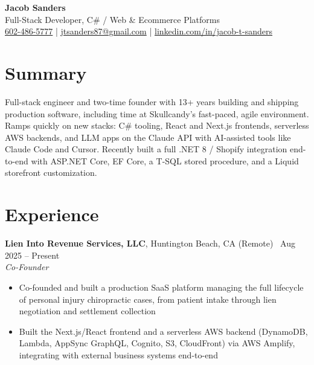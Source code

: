 \documentclass[10.5pt, letterpaper]{article}
\newcommand{\jobentry}[4]{%
  \noindent
  \textbf{\color{accent}#1}\textcolor{muted}{, #2 \textbullet\ #4}\\
  \textit{#3}%
}
\begin{document}
\begin{center}
  {\fontsize{28}{32}\selectfont\bfseries\color{accent} Jacob Sanders}\\[5pt]
  {\large\color{muted} Full-Stack Developer, C\# / Web \& Ecommerce Platforms}\\[8pt]
  \small
  \faPhone\enspace \href{tel:6024865777}{602-486-5777}
  \enspace\textcolor{accent}{|}\enspace
  \faEnvelope\enspace \href{mailto:jtsanders87@gmail.com}{jtsanders87@gmail.com}
  \enspace\textcolor{accent}{|}\enspace
  \faLinkedin\enspace \href{https://linkedin.com/in/jacob-t-sanders}{linkedin.com/in/jacob-t-sanders}
\end{center}

\section{Summary}

Full-stack engineer and two-time founder with 13+ years building and shipping
production software, including time at Skullcandy's fast-paced, agile
environment. Ramps quickly on new stacks: C\# tooling, React and
Next.js frontends, serverless AWS backends, and LLM apps on the Claude API with
AI-assisted tools like Claude Code and Cursor. Recently built a full .NET 8 /
Shopify integration end-to-end with ASP.NET Core, EF Core, a T-SQL stored
procedure, and a Liquid storefront customization.

\section{Experience}

\jobentry{Lien Into Revenue Services, LLC}{Huntington Beach, CA (Remote)}{Co-Founder}{Aug 2025 -- Present}
\begin{itemize}
  \item Co-founded and built a production SaaS platform managing the full
        lifecycle of personal injury chiropractic cases, from patient intake
        through lien negotiation and settlement collection
  \item Built the Next.js/React frontend and a serverless AWS backend
        (DynamoDB, Lambda, AppSync GraphQL, Cognito, S3, CloudFront) via
        AWS Amplify, integrating with external business systems end-to-end
\end{itemize}
\end{document}
